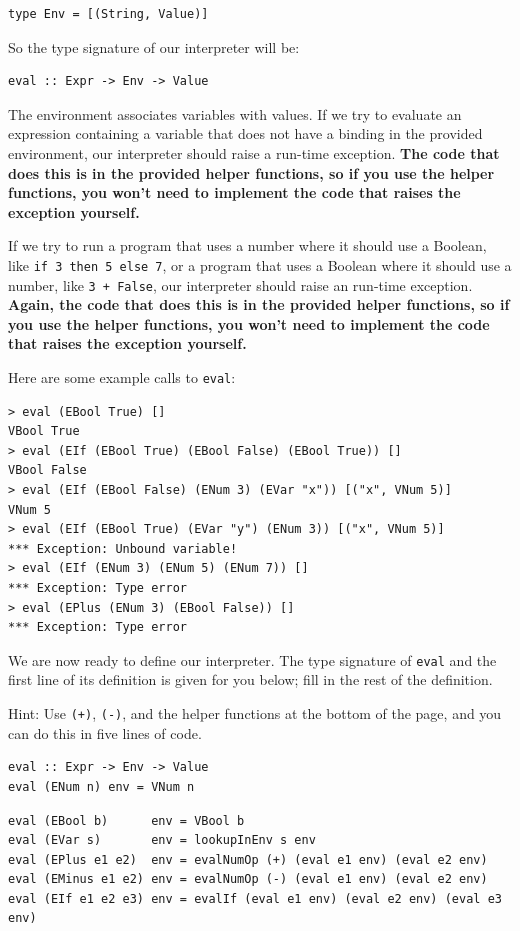 \documentclass[addpoints]{exam}
\begin{document}
\begin{questions}
\begin{verbatim}
type Env = [(String, Value)]
\end{verbatim}

So the type signature of our interpreter will be:

\begin{verbatim}
eval :: Expr -> Env -> Value
\end{verbatim}

The environment associates variables with values.  If we try to evaluate an expression containing a variable that does not have a binding in the provided environment, our interpreter should raise a run-time exception. \textbf{The code that does this is in the provided helper functions, so if you use the helper functions, you won't need to implement the code that raises the exception yourself.}

If we try to run a program that uses a number where it should use a Boolean, like \verb|if 3 then 5 else 7|, or a program that uses a Boolean where it should use a number, like \verb|3 + False|, our interpreter should raise an run-time exception.  \textbf{Again, the code that does this is in the provided helper functions, so if you use the helper functions, you won't need to implement the code that raises the exception yourself.}

Here are some example calls to \verb|eval|:
\begin{verbatim}
> eval (EBool True) []
VBool True
> eval (EIf (EBool True) (EBool False) (EBool True)) []
VBool False
> eval (EIf (EBool False) (ENum 3) (EVar "x")) [("x", VNum 5)]
VNum 5
> eval (EIf (EBool True) (EVar "y") (ENum 3)) [("x", VNum 5)]
*** Exception: Unbound variable!
> eval (EIf (ENum 3) (ENum 5) (ENum 7)) []
*** Exception: Type error
> eval (EPlus (ENum 3) (EBool False)) []
*** Exception: Type error
\end{verbatim}

\newpage

We are now ready to define our interpreter.  The type signature of \verb|eval| and the first line of its definition is given for you below; fill in the rest of the definition.

Hint: Use \verb|(+)|, \verb|(-)|, and the helper functions at the bottom of the page, and you can do this in five lines of code.

\begin{verbatim}
eval :: Expr -> Env -> Value
eval (ENum n) env = VNum n
\end{verbatim}
\begin{solutionorbox}[4in]
\begin{verbatim}
eval (EBool b)      env = VBool b
eval (EVar s)       env = lookupInEnv s env
eval (EPlus e1 e2)  env = evalNumOp (+) (eval e1 env) (eval e2 env)
eval (EMinus e1 e2) env = evalNumOp (-) (eval e1 env) (eval e2 env)
eval (EIf e1 e2 e3) env = evalIf (eval e1 env) (eval e2 env) (eval e3 env)
\end{verbatim}
\end{solutionorbox}


\end{questions}
\end{document}

